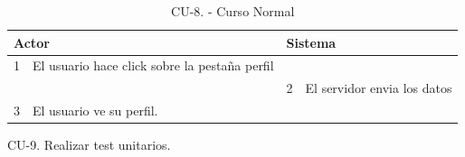 \begin{itemize}
\begin{itemize}
\begin{table}[H]
\begin{tabularx}{\textwidth}{|l|X|l|X|}
        \multicolumn{2}{|l|}{\cellcolor[HTML]{EFEFEF}Actor} & \multicolumn{2}{l|}{\cellcolor[HTML]{EFEFEF}Sistema} \\ \hline
        1                         & El usuario hace click sobre la pestaña perfil                     &                            &                         \\ \hline
                                  &                         & 2                          & El servidor envia los datos                     \\ \hline
        3                         & El usuario ve su perfil.      &                          &                        \\ \hline
                                  
      \end{tabularx}
      \caption{CU-8. - Curso Normal}
      \label{my-label}
    \end{table}
  \end{itemize}
  \end{itemize}
  \item CU-9. Realizar test unitarios.
